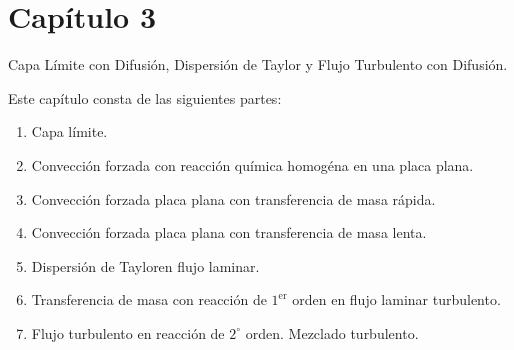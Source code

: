 \chapter{Capítulo 3}
Capa Límite con Difusión, Dispersión de Taylor y Flujo Turbulento con Difusión.

Este capítulo consta de las siguientes partes:
\begin{enumerate}
    \item Capa límite.
    \item Convección forzada con reacción química homogéna en una placa plana.
    \item Convección forzada  placa plana con transferencia de masa rápida.
    \item Convección forzada  placa plana con transferencia de masa lenta.
    \item Dispersión de Tayloren flujo laminar.
    \item Transferencia de masa con reacción de $1^{\text{er}}$ orden en flujo laminar turbulento.
    \item Flujo turbulento en reacción de $2^{\circ}$ orden. Mezclado turbulento.
\end{enumerate}
